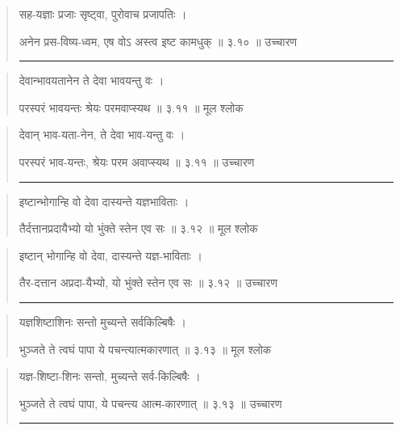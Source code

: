 \begin{quotation}

सह-यज्ञाः प्रजाः सृष्ट्वा, पुरोवाच प्रजापतिः  ।  

अनेन प्रस-विष्य-ध्वम, एष वोऽ अस्त्व इष्ट कामधुक्‌  ॥ ३.१० ॥  उच्चारण

\noindent\rule{16cm}{0.4pt} 
\end{quotation}


\begin{quotation}

देवान्भावयतानेन ते देवा भावयन्तु वः  ।  

परस्परं भावयन्तः श्रेयः परमवाप्स्यथ  ॥ ३.११ ॥  मूल श्लोक
\end{quotation}

\begin{quotation}
देवान् भाव-यता-नेन, ते देवा भाव-यन्तु वः  ।  

परस्परं भाव-यन्तः, श्रेयः परम अवाप्स्यथ  ॥ ३.११ ॥  उच्चारण

\noindent\rule{16cm}{0.4pt} 
\end{quotation}


\begin{quotation}

इष्टान्भोगान्हि वो देवा दास्यन्ते यज्ञभाविताः  ।  

तैर्दत्तानप्रदायैभ्यो यो भुंक्ते स्तेन एव सः  ॥ ३.१२ ॥  मूल श्लोक
\end{quotation}

\begin{quotation}

इष्टान् भोगान्हि वो देवा, दास्यन्ते यज्ञ-भाविताः  ।  

तैर-दत्तान अप्रदा-यैभ्यो, यो भुंक्ते स्तेन एव सः  ॥ ३.१२ ॥  उच्चारण

\noindent\rule{16cm}{0.4pt} 
\end{quotation}


\begin{quotation}

यज्ञशिष्टाशिनः सन्तो मुच्यन्ते सर्वकिल्बिषैः  ।  

भुञ्जते ते त्वघं पापा ये पचन्त्यात्मकारणात्‌  ॥ ३.१३ ॥  मूल श्लोक
\end{quotation}

\begin{quotation}

यज्ञ-शिष्टा-शिनः सन्तो, मुच्यन्ते सर्व-किल्बिषैः  ।  

भुञ्जते ते त्वघं पापा, ये पचन्त्य आत्म-कारणात्‌  ॥ ३.१३ ॥  उच्चारण

\noindent\rule{16cm}{0.4pt} 
\end{quotation}



